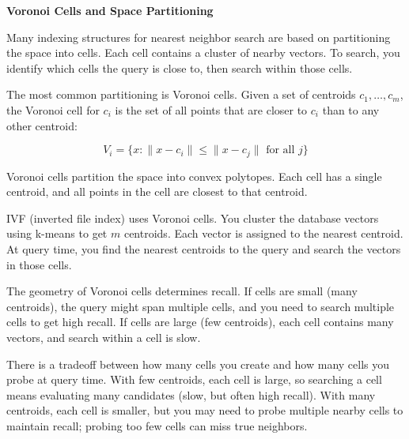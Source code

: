 \vspace{2em}


\begin{geometrylens}
\textbf{Voronoi Cells and Space Partitioning}

\vspace{0.5em}

Many indexing structures for nearest neighbor search are based on partitioning the space into cells. Each cell contains a cluster of nearby vectors. To search, you identify which cells the query is close to, then search within those cells.

\vspace{0.5em}

The most common partitioning is Voronoi cells. Given a set of centroids $c_1, \ldots, c_m$, the Voronoi cell for $c_i$ is the set of all points that are closer to $c_i$ than to any other centroid:

\begin{equation*}
V_i = \{x : \|x - c_i\| \leq \|x - c_j\| \text{ for all } j\}
\end{equation*}

Voronoi cells partition the space into convex polytopes. Each cell has a single centroid, and all points in the cell are closest to that centroid.

\vspace{0.5em}

IVF (inverted file index) uses Voronoi cells. You cluster the database vectors using k-means to get $m$ centroids. Each vector is assigned to the nearest centroid. At query time, you find the nearest centroids to the query and search the vectors in those cells.

\vspace{0.5em}

The geometry of Voronoi cells determines recall. If cells are small (many centroids), the query might span multiple cells, and you need to search multiple cells to get high recall. If cells are large (few centroids), each cell contains many vectors, and search within a cell is slow.

\vspace{0.5em}

There is a tradeoff between how many cells you create and how many cells you probe at query time. With few centroids, each cell is large, so searching a cell means evaluating many candidates (slow, but often high recall). With many centroids, each cell is smaller, but you may need to probe multiple nearby cells to maintain recall; probing too few cells can miss true neighbors.
\end{geometrylens}

